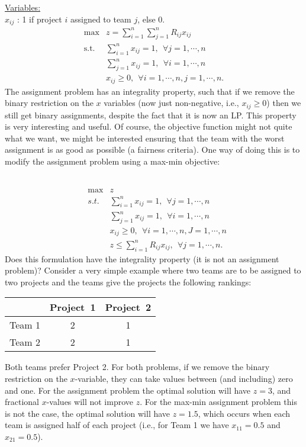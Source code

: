 \smallskip \underline{Variables:} \\
$x_{ij}$ : 1 if project $i$ assigned to team $j$, else 0.
\begin{align*}
\max   & z = \sum_{i=1}^{n}\sum_{j=1}^{n} R_{ij} x_{ij}  \\
\mbox{s.t.~}& \sum_{i=1}^{n} x_{ij} = 1,~~ \forall j = 1,\cdots,n  \\
& \sum_{j=1}^{n} x_{ij} = 1,~~ \forall i = 1,\cdots,n  \\
& x_{ij} \ge 0,~~ \forall i = 1,\cdots,n, j = 1,\cdots,n. 
\end{align*}
The assignment problem has an integrality property, such that if we remove the binary restriction on the $x$ variables (now just non-negative, i.e., $x_{ij} \ge 0$) then we still get binary assignments, despite the fact that it is now an LP.  This property is very interesting and useful. Of course, the objective function might not quite what we want, we might be interested ensuring that the team with the worst assignment is as good as possible (a fairness criteria). One way of doing this is to modify the assignment problem using a max-min objective:

 \\
\begin{eqnarray}
& \max  & z  \nonumber \\
& s.t. & \sum_{i=1}^{n} x_{ij} = 1,~~ \forall j = 1,\cdots,n \nonumber \\
&      & \sum_{j=1}^{n} x_{ij} = 1,~~ \forall i = 1,\cdots,n \nonumber \\
&      & x_{ij} \ge 0,~~ \forall i = 1,\cdots,n, J = 1,\cdots,n \nonumber \\
&      & z \le \sum_{i=1}^{n} R_{ij} x_{ij},~~ \forall j = 1,\cdots,n. \nonumber
\end{eqnarray}
Does this formulation have the integrality property (it is not an assignment problem)?  Consider a very simple example where two teams are to be assigned to two projects and the teams give the projects the following rankings:
\begin{table}[h!] \begin{center} \begin{tabular} {|c||c|c|}
\hline           & Project~1 & Project~2 \\ \hline \hline
\hline Team 1    & 2  & 1  \\
\hline Team 2    & 2  & 1 \\ \hline
\end{tabular} \end{center} \end{table}
Both teams prefer Project 2.  For both problems, if we remove the binary restriction on the
$x$-variable, they can take values between (and including) zero and one. For the assignment problem the optimal solution will have $z=3$, and fractional $x$-values will not improve $z$. For the max-min assignment problem this is not the case, the optimal solution will have $z=1.5$, which occurs when each team is assigned half of each project (i.e., for Team 1 we have $x_{11} = 0.5$ and $x_{21} = 0.5$).


